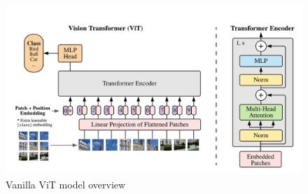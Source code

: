 \documentclass[a4paper,12pt,openright]{book}
\begin{document}
\begin{figure}[H]
\centering
\includegraphics[trim={2cm 0cm 0cm 0cm},clip,width=1.0\textwidth]{images/eva_arhitecture_hq.png}
\caption{Vanilla ViT model overview 
\cite{DBLP:journals/corr/abs-2010-11929}}\label{fig:eva}
\end{figure}
\newpage
\end{document}
